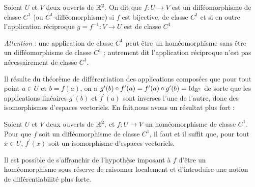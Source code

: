 \begin{fdefn}\label{def:diffeo}
Soient $U$ et $V$ deux ouverts de $\mathbb R^2$. On dit que $f \colon U \to V$ est un difféomorphisme de classe $C^1$ (ou $C^1$-difféomorphisme) 
si $f$ est bijective, de classe $C^1$ et si en outre l'application réciproque $g=f^{-1} \colon V \to U$ est de classe $C^1$
\end{fdefn}

\emph{Attention} : une application de classe $C^1$ peut être un homéomorphisme sans être un difféomorphisme de classe $C^1$ ; autrement dit l'application réciproque n'est pas nécessairement de classe $C^1$.

Il résulte du théorème de différentiation des applications composées que pour tout point $a \in U$ et $b=f(a)$, on a $g^\prime(b) \circ f^\prime(a)=f^\prime(a) \circ g^\prime(b) = \text{Id}_{\mathbb R^2}$ de sorte que les applications linéaires $g^\prime(b)$ et $f^\prime(a)$ sont inverses l'une de l'autre, donc des isomorphismes d'espaces vectoriels. En fait,nous avons un résultat plus fort :

\begin{fprop}
  \label{prop:homeo_diffeo}
   Soient $U$ et $V$ deux ouverts de $\mathbb R^2$, et $f \colon U \to V$ un homéomorphisme de classe $C^1$. Pour que $f$ soit un difféomorphisme de classe $C^1$, il faut et il suffit que, pour tout $x \in U$, $f^\prime(x)$ soit un isomorphisme d'espaces vectoriels.
\end{fprop}

Il est possible de s'affranchir de l'hypothèse imposant à $f$ d'être un homéomorphisme sous réserve de raisonner localement et 
d'introduire une notion de différentiabilité plus forte.


